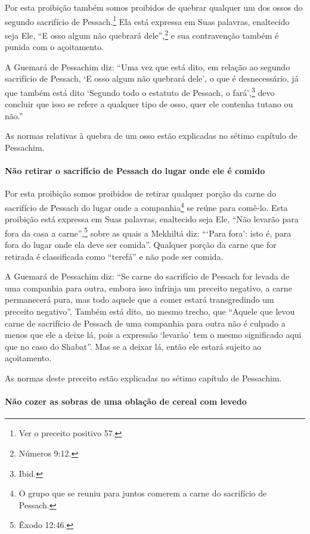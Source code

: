 Por esta proibição também somos proibidos de quebrar qualquer um dos
ossos do segundo sacrifício de Pessach.\footnote{Ver o preceito positivo 57.} Ela
está expressa em Suas palavras, enaltecido seja Ele, ``E osso algum não
quebrará dele'',\footnote{Números 9:12.} e sua contravenção também é punida com o
açoitamento.

A Guemará de Pessachim diz: ``Uma vez que está dito, em relação ao
segundo sacrifício de Pessach, `E osso algum não quebrará dele', o que
é desnecessário, já que também está dito `Segundo todo o estatuto de
Pessach, o fará',\footnote{Ibid.} devo concluir que isso se refere a qualquer
tipo de osso, quer ele contenha tutano ou não.''

As normas relativas à quebra de um osso estão explicadas no sétimo
capítulo de Pessachim.

\paragraph{Não retirar o sacrifício de Pessach do lugar onde ele é comido}

Por esta proibição somos proibidos de retirar qualquer porção da carne
do sacrifício de Pessach do lugar onde a
companhia\footnote{O grupo que se reuniu para juntos comerem a carne do sacrifício de
  Pessach.} se reúne para comê-lo. Esta proibição
está expressa em Suas palavras, enaltecido seja Ele, ``Não levarão para
fora da casa a carne'',\footnote{Êxodo 12:46.} sobre as quais a Mekhiltá diz:
```Para fora': isto é, para fora do lugar onde ela deve ser comida''.
Qualquer porção da carne que for retirada é classificada como ``terefá''
e não pode ser comida.

A Guemará de Pessachim diz: ``Se carne do sacrifício de Pessach for
levada de uma companhia para outra, embora isso
infrinja um preceito negativo, a carne permanecerá pura, mas todo aquele
que a comer estará transgredindo um preceito negativo''. Também está
dito, no mesmo trecho, que ``Aquele que levou carne de sacrifício de
Pessach de uma companhia para outra não é
culpado a menos que ele a deixe lá, pois a expressão `levarão' tem o
mesmo significado aqui que no caso do Shabat''. Mas se a deixar lá,
então ele estará sujeito ao açoitamento.

As normas deste preceito estão explicadas no sétimo capítulo de Pessachim.

\paragraph{Não cozer as sobras de uma oblação de cereal com levedo}

